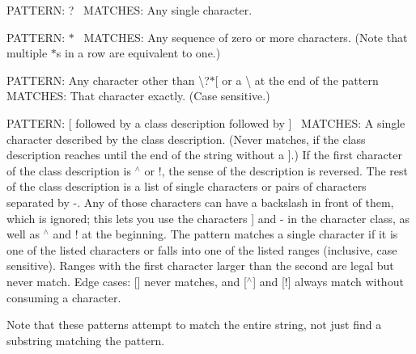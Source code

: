 P\+A\+T\+T\+E\+RN\+: ?~\newline
 M\+A\+T\+C\+H\+ES\+: Any single character. 

P\+A\+T\+T\+E\+RN\+: $\ast$~\newline
 M\+A\+T\+C\+H\+ES\+: Any sequence of zero or more characters. (Note that multiple $\ast$s in a row are equivalent to one.)

P\+A\+T\+T\+E\+RN\+: Any character other than \textbackslash{}?$\ast$\mbox{[} or a \textbackslash{} at the end of the pattern~\newline
 M\+A\+T\+C\+H\+ES\+: That character exactly. (Case sensitive.)

P\+A\+T\+T\+E\+RN\+: \mbox{[} followed by a class description followed by \mbox{]}~\newline
 M\+A\+T\+C\+H\+ES\+: A single character described by the class description. (Never matches, if the class description reaches until the end of the string without a \mbox{]}.) If the first character of the class description is $^\wedge$ or !, the sense of the description is reversed. The rest of the class description is a list of single characters or pairs of characters separated by -\/. Any of those characters can have a backslash in front of them, which is ignored; this lets you use the characters \mbox{]} and -\/ in the character class, as well as $^\wedge$ and ! at the beginning. The pattern matches a single character if it is one of the listed characters or falls into one of the listed ranges (inclusive, case sensitive). Ranges with the first character larger than the second are legal but never match. Edge cases\+: \mbox{[}\mbox{]} never matches, and \mbox{[}$^\wedge$\mbox{]} and \mbox{[}!\mbox{]} always match without consuming a character.

Note that these patterns attempt to match the entire string, not just find a substring matching the pattern.



